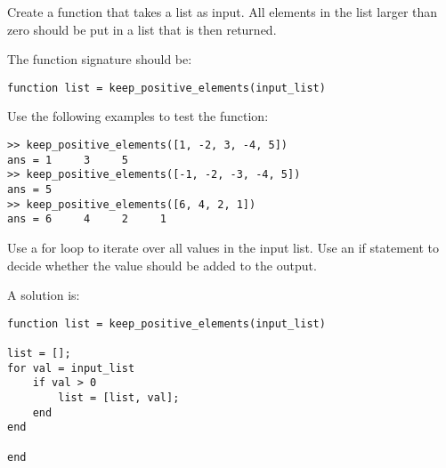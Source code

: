 \begin{ex}
Create a function that takes a list as input.
All elements in the list larger than zero should 
be put in a list that is then returned.

The function signature should be:
\begin{lstlisting}
function list = keep_positive_elements(input_list)
\end{lstlisting}
Use the following examples to test the function:
\begin{lstlisting}
>> keep_positive_elements([1, -2, 3, -4, 5])
ans = 1     3     5
>> keep_positive_elements([-1, -2, -3, -4, 5])
ans = 5
>> keep_positive_elements([6, 4, 2, 1])
ans = 6     4     2     1
\end{lstlisting}
\begin{hint}
Use a for loop to iterate over all values in 
the input list.
Use an if statement to decide whether the value
should be added to the output.
\end{hint}
\begin{sol}
A solution is:
\begin{lstlisting}
function list = keep_positive_elements(input_list)

list = [];
for val = input_list
    if val > 0
        list = [list, val];
    end
end

end
\end{lstlisting}
\end{sol}
\end{ex}


